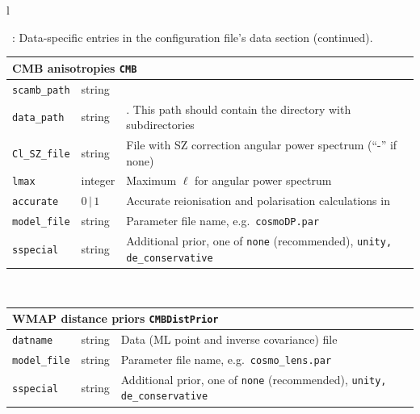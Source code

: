 \documentclass[11pt, chapterprefix, headsepline]{scrartcl}
\begin{document}
\begin{longtable}{l}
\begin{minipage}{\textwidth}
  \centerline{\tablename\ \thetable{}: Data-specific entries in the configuration file's data
    section (continued).}
  \begin{tabularx}{\textwidth}{llX}
    \\
   \hline \multicolumn{3}{l}{\rul CMB anisotropies \quad \texttt{CMB}} \\ \hline
    \texttt{scamb\_path}  & string & \direc{/path/to/scamb} \\
    \texttt{data\_path}   & string & \direc{/path/to/wmap-data}. This
    path should contain the directory \direc{data} with subdirectories
    \direc{healpix\_data, highl, lowlP, lowlP} \\
    \texttt{Cl\_SZ\_file} & string & File with SZ correction
    angular power spectrum (``-'' if none) \\
    \texttt{lmax}         & integer & Maximum $\ell$ for angular power spectrum \\
    \texttt{accurate}     & $0\,|\,1$  & Accurate reionisation and
    polarisation calculations in \progr{camb} \\
    \texttt{model\_file}   & string & Parameter file name, e.g.~\texttt{cosmoDP.par} \\
    \texttt{sspecial}   & string & Additional prior, one of
    \texttt{none} (recommended), \texttt{unity, de\_conservative} \\
    \hline
    \end{tabularx}
    \\

   \begin{tabularx}{\textwidth}{llX}
     \\
   \hline \multicolumn{3}{l}{\rul WMAP distance priors \quad \texttt{CMBDistPrior}} \\ \hline
    \texttt{datname} & string & Data (ML point and inverse covariance) file \\
    \texttt{model\_file}   & string & Parameter file name, e.g.~\texttt{cosmo\_lens.par} \\
    \texttt{sspecial}   & string & Additional prior, one of
    \texttt{none} (recommended), \texttt{unity, de\_conservative} \\
    \hline
    \end{tabularx}
    \\
\end{minipage}
\\ \\


\end{longtable}
\end{document}
